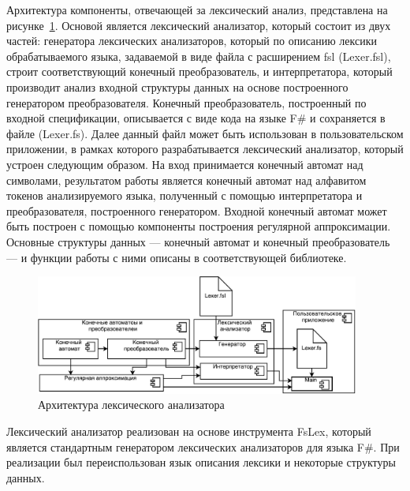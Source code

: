 Архитектура компоненты, отвечающей за лексический анализ, представлена на рисунке~\ref{fig:LexArch}. Основой является  лексический анализатор, который состоит из двух частей: генератора лексических анализаторов, который по описанию лексики обрабатываемого языка, задаваемой в виде файла с расширением fsl (Lexer.fsl), строит соответствующий конечный преобразователь, и интерпретатора, который производит анализ входной структуры данных на основе построенного генератором преобразователя. Конечный преобразователь, построенный по входной спецификации, описывается с виде кода на языке F\# и сохраняется в файле (Lexer.fs). Далее данный файл может быть использован в пользовательском приложении, в рамках которого разрабатывается лексический анализатор, который устроен следующим образом. На вход принимается конечный автомат над символами, результатом работы является конечный автомат над алфавитом токенов анализируемого языка, полученный с помощью интерпретатора и преобразователя, построенного генератором. Входной конечный автомат может быть построен с помощью компоненты построения регулярной аппроксимации. Основные структуры данных --- конечный автомат и конечный преобразователь --- и функции работы с ними описаны в соответствующей библиотеке.

\begin{figure}[h!]
\begin{center}
\includegraphics[width=0.95\textwidth]{pics/LexerDiagram}
\caption{Архитектура лексического анализатора}
\label{fig:LexArch} 
\end{center}
\end{figure}

Лексический анализатор реализован на основе инструмента FsLex, который является стандартным генератором лексических анализаторов для языка F\#. При реализации был переиспользован язык описания лексики и некоторые структуры данных.


